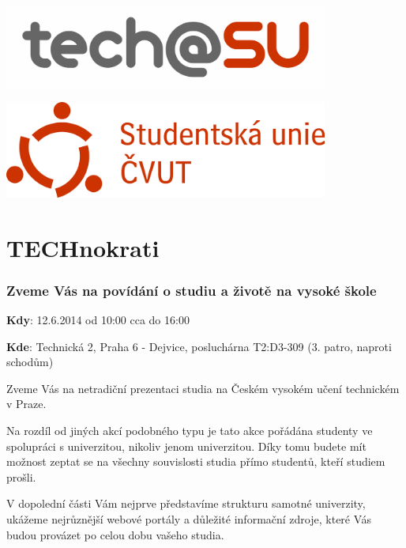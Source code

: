 \documentclass[12pt]{extarticle}[10.3.2013]
\author{Tomáš Kukrál}
\newcommand{\B}[1]{\textbf{{#1}}}
\begin{document}
\pagestyle{empty}

\begin{minipage}[c]{0.5\textwidth}
\begin{center}
	{\includegraphics[width=0.8\textwidth]{logo-obdelnik.png}}
\end{center}
\end{minipage}
\begin{minipage}[c]{0.5\textwidth}
\begin{center}
	{\includegraphics[width=0.8\textwidth]{logo-su.png}}
\end{center}
\end{minipage}

\part*{TECHnokrati}
\section*{Zveme Vás na povídání o studiu a životě na vysoké škole}

\B{Kdy}: 12.6.2014 od 10:00 cca do 16:00

\B{Kde}: Technická 2, Praha 6 - Dejvice, posluchárna T2:D3-309 (3. patro,
naproti schodům)



\vspace{1em}

Zveme Vás na netradiční prezentaci studia na Českém vysokém učení technickém v Praze.

Na rozdíl od jiných akcí podobného typu je tato akce pořádána studenty
ve spolupráci s univerzitou, nikoliv jenom univerzitou. Díky tomu budete mít možnost zeptat se na všechny
souvislosti studia přímo studentů, kteří studiem prošli.

V dopolední části Vám nejprve představíme strukturu samotné univerzity,
ukážeme nejrůznější webové portály a důležité informační zdroje,
které Vás budou provázet po celou dobu vašeho studia. 
\end{document}
